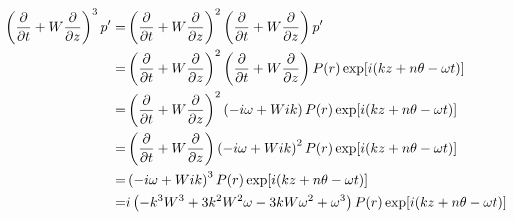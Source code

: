 \documentclass[onecolumn,10pt]{jhwhw}
\begin{document}
%
\begin{align*}
\left ( \dfrac{\partial}{\partial t} + W \dfrac{\partial}{\partial z} \right)^3 p^{\prime} =&
\left ( \dfrac{\partial}{\partial t} + W \dfrac{\partial}{\partial z} \right)^2 \left ( \dfrac{\partial}{\partial t} + W \dfrac{\partial}{\partial z} \right) p^{\prime} \\
=& \left ( \dfrac{\partial}{\partial t} + W \dfrac{\partial}{\partial z} \right)^2 \left ( \dfrac{\partial}{\partial t} + W \dfrac{\partial}{\partial z} \right) P(r) \exp[i(kz+n \theta - \omega t)] \\
=& \left ( \dfrac{\partial}{\partial t} + W \dfrac{\partial}{\partial z} \right)^2 \left ( -i \omega + W ik \right) P(r) \exp[i(kz+n \theta - \omega t)] \\
=& \left ( \dfrac{\partial}{\partial t} + W \dfrac{\partial}{\partial z} \right) \left ( -i \omega + W ik \right)^2 P(r) \exp[i(kz+n \theta - \omega t)] \\
=& \left ( -i \omega + W ik \right)^3 P(r) \exp[i(kz+n \theta - \omega t)] \\
=& i \left ( - k^3 W^3 + 3 k^2 W^2 \omega -3 k W \omega^2 + \omega^3 \right ) P(r) \exp[i(kz+n \theta - \omega t)]
\end{align*}
\end{document}
